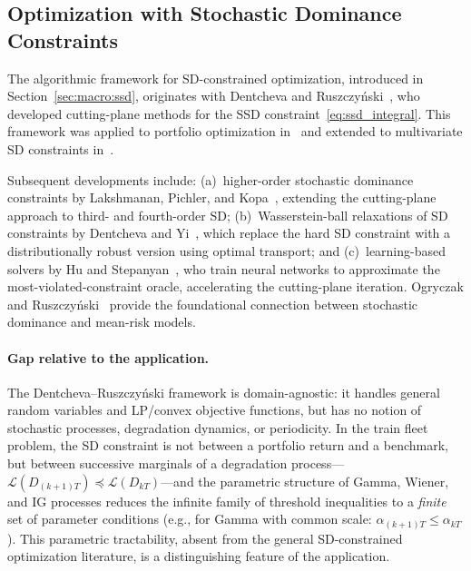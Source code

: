 \documentclass[11pt,a4paper]{article}
\theoremstyle{plain}
\theoremstyle{definition}
\theoremstyle{remark}
\begin{document}
\subsection{Optimization with Stochastic Dominance Constraints}
\label{sec:related:s2}

The algorithmic framework for SD-constrained optimization, introduced in Section~\ref{sec:macro:ssd}, originates with Dentcheva and Ruszczy\'nski~\cite{dentcheva2003}, who developed cutting-plane methods for the SSD constraint~\eqref{eq:ssd_integral}. This framework was applied to portfolio optimization in~\cite{dentcheva2006} and extended to multivariate SD constraints in~\cite{dentcheva2009}.

Subsequent developments include: (a)~higher-order stochastic dominance constraints by Lakshmanan, Pichler, and Kopa~\cite{lakshmanan2025}, extending the cutting-plane approach to third- and fourth-order SD; (b)~Wasserstein-ball relaxations of SD constraints by Dentcheva and Yi~\cite{dentchevayi2025}, which replace the hard SD constraint with a distributionally robust version using optimal transport; and (c)~learning-based solvers by Hu and Stepanyan~\cite{hu2022}, who train neural networks to approximate the most-violated-constraint oracle, accelerating the cutting-plane iteration. Ogryczak and Ruszczy\'nski~\cite{ogryczak1999} provide the foundational connection between stochastic dominance and mean-risk models.

\paragraph{Gap relative to the application.}
The Dentcheva--Ruszczy\'nski framework is domain-agnostic: it handles general random variables and LP/convex objective functions, but has no notion of stochastic processes, degradation dynamics, or periodicity. In the train fleet problem, the SD constraint is not between a portfolio return and a benchmark, but between successive marginals of a degradation process---$\mathcal{L}(D_{(k+1)T})\preceq\mathcal{L}(D_{kT})$---and the parametric structure of Gamma, Wiener, and IG processes reduces the infinite family of threshold inequalities to a \emph{finite} set of parameter conditions (e.g., for Gamma with common scale: $\alpha_{(k+1)T}\le\alpha_{kT}$). This parametric tractability, absent from the general SD-constrained optimization literature, is a distinguishing feature of the application.
\end{document}
